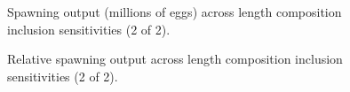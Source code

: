 \documentclass[
]{scrartcl}
\begin{document}
\begin{figure}


\caption{\label{fig-sens_lengths2_spout}Spawning output (millions of
eggs) across length composition inclusion sensitivities (2 of 2).}

\end{figure}%

\begin{figure}


\caption{\label{fig-sens_lengths2_status}Relative spawning output across
length composition inclusion sensitivities (2 of 2).}

\end{figure}%
\end{document}
